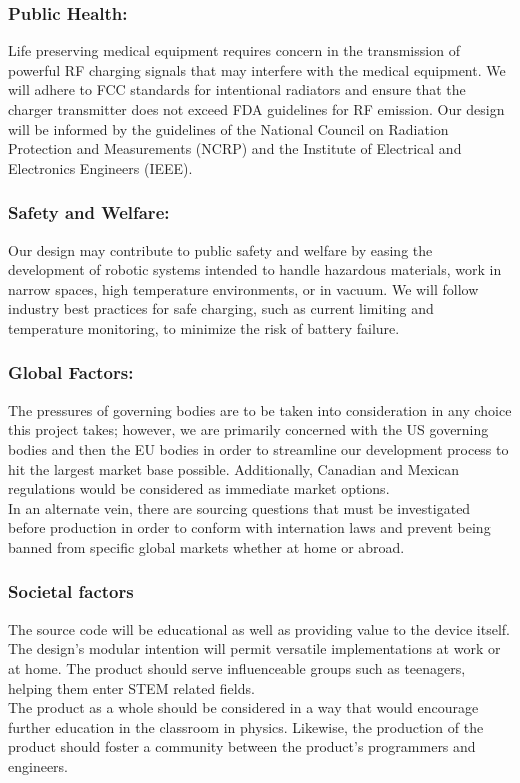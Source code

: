 \documentclass[12pt]{article}
\begin{document}
\subsubsection{Public Health:}
Life preserving medical equipment requires concern in the transmission of powerful RF charging signals that may interfere with the medical equipment. We will adhere to FCC standards for intentional radiators and ensure that the charger transmitter does not exceed FDA guidelines for RF emission. Our design will be informed by the guidelines of the National Council on Radiation Protection and Measurements (NCRP) and the Institute of Electrical and Electronics Engineers (IEEE).
 
\subsubsection{Safety and Welfare:}
Our design may contribute to public safety and welfare by easing the development of robotic systems intended to handle hazardous materials, work in narrow spaces, high temperature environments, or in vacuum. We will follow industry best practices for safe charging, such as current limiting and temperature monitoring, to minimize the risk of battery failure.

\pagebreak

\subsubsection{Global Factors:}
The pressures of governing bodies are to be taken into consideration in any choice this project takes; however, we are primarily concerned with the US governing bodies and then the EU bodies in order to streamline our development process to hit the largest market base possible.  Additionally, Canadian and Mexican regulations would be considered as immediate market options.\\
In an alternate vein, there are sourcing questions that must be investigated before production in order to conform with internation laws and prevent being banned from specific global markets whether at home or abroad.

\subsubsection{Societal factors}
The source code will be educational as well as providing value to the device itself.  The design's modular intention will permit versatile implementations at work or at home.  The product should serve influenceable groups such as teenagers, helping them enter STEM related fields.\\
The product as a whole should be considered in a way that would encourage further education in the classroom in physics.  Likewise, the production of the product should foster a community between the product's programmers and engineers.
\end{document}
